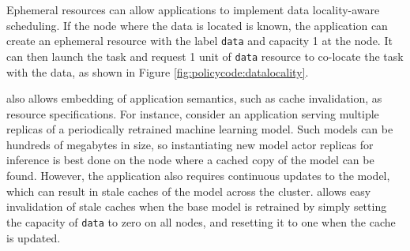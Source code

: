 
Ephemeral resources can allow applications to implement data locality-aware scheduling. If the node where the data is located is known, the application can create an ephemeral resource with the label \lstinline{data} and capacity 1 at the node. It can then launch the task and request 1 unit of \lstinline{data} resource to co-locate the task with the data, as shown in Figure \ref{fig:policycode:datalocality}. 

\name{} also allows embedding of application semantics, such as cache invalidation, as resource specifications. For instance, consider an application \cite{clipper} serving multiple replicas of a periodically retrained machine learning model. Such models can be hundreds of megabytes in size, so instantiating new model actor replicas for inference is best done on the node where a cached copy of the model can be found. However, the application also requires continuous updates to the model, which can result in stale caches of the model across the cluster. \name{} allows easy invalidation of stale caches when the base model is retrained by simply setting the capacity of \lstinline{data} to zero on all nodes, and resetting it to one when the cache is updated.




